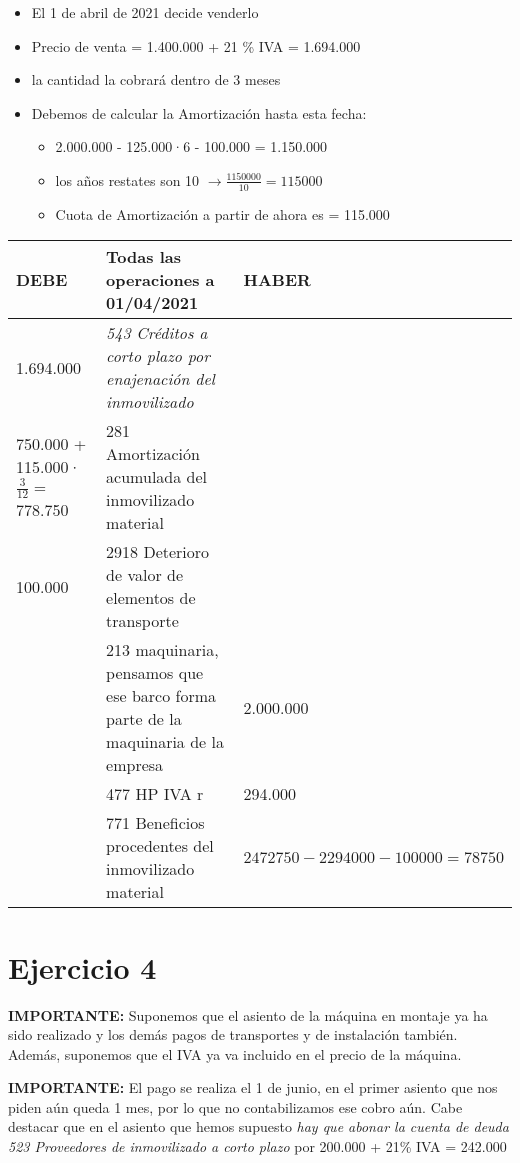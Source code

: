 \documentclass[a4paper,12pt]{article}
\newcommand{\enajenacion}{543 Créditos a corto plazo por enajenación del inmovilizado}
\newcommand{\benefIM}{771 Beneficios procedentes del inmovilizado material}
\begin{document}
\begin{itemize}
    \item El 1 de abril de 2021 decide venderlo
    \item Precio de venta = 1.400.000 + 21 \% IVA = 1.694.000   
    \item la cantidad la cobrará dentro de 3 meses
    \item Debemos de calcular la Amortización hasta esta fecha:
    \begin{itemize}
        \item 2.000.000 - 125.000·6 - 100.000 = 1.150.000
        \item los años restates son 10 $\rightarrow \frac{1150000}{10} = 115000$
        \item Cuota de Amortización a partir de ahora es = 115.000
    \end{itemize}
\end{itemize}
\begin{table}[H]
    \centering
    \begin{tabular}{|p{3cm}|p{6cm}|p{3cm}|}
    \hline
    \textbf{DEBE} & \textbf{Todas las operaciones a 01/04/2021} & \textbf{HABER} \\
    \hline 
    1.694.000 & \textit{\enajenacion}& \\
    \hline
    750.000 + 115.000·$\frac{3}{12} =$ 778.750 & 281 Amortización acumulada del inmovilizado material& \\
    \hline
    100.000&2918 Deterioro de valor de elementos de transporte&\\
    \hline
    & 213 maquinaria, pensamos que ese barco forma parte de la maquinaria de la empresa& 2.000.000 \\
    \hline
    & 477 HP IVA r& 294.000\\
    \hline
    & \benefIM & $2472750 - 2294000 - 100000= 78750$\\
    \hline
    \end{tabular}
\end{table}


\section{Ejercicio 4}

\begin{tcolorbox}[colback=red!5!white, colframe=yellow!75!black, title=NOTA]  
    \textbf{IMPORTANTE:} Suponemos que el asiento de la máquina en montaje ya ha sido realizado y los demás pagos de transportes y de instalación también. Además, suponemos que el IVA ya va incluido en el precio de la máquina.
    
\end{tcolorbox}
\begin{tcolorbox}[colback=red!5!white, colframe=yellow!75!black, title=NOTA]  
    \textbf{IMPORTANTE:} El pago se realiza el 1 de junio, en el primer asiento que nos piden aún queda 1 mes, por lo que no contabilizamos ese cobro aún. Cabe destacar que en el asiento que hemos supuesto \textit{hay que abonar la cuenta de deuda 523 Proveedores de inmovilizado a corto plazo} por 200.000 + 21\% IVA = 242.000
    
\end{tcolorbox}
\end{document}
